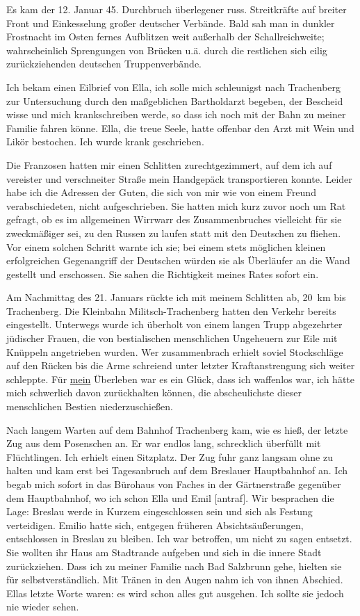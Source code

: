 Es kam der 12. Januar 45. Durchbruch überlegener russ. Streitkräfte auf breiter Front und Einkesselung großer deutscher Verbände. Bald sah man in dunkler Frostnacht im Osten fernes Aufblitzen weit außerhalb der Schallreichweite; wahrscheinlich Sprengungen von Brücken u.ä. durch die restlichen sich eilig zurückziehenden deutschen Truppenverbände.

Ich bekam einen Eilbrief von Ella, ich solle mich schleunigst nach Trachenberg zur Untersuchung durch den maßgeblichen Bartholdarzt begeben, der Bescheid wisse und mich krankschreiben werde, so dass ich noch mit der Bahn zu meiner Familie fahren könne. Ella, die treue Seele, hatte offenbar den Arzt mit Wein und Likör bestochen. Ich wurde krank geschrieben.

 Die Franzosen hatten mir einen Schlitten zurechtgezimmert, auf dem ich auf vereister und verschneiter Straße mein Handgepäck transportieren konnte. Leider habe ich die Adressen der Guten, die sich von mir wie von einem Freund verabschiedeten, nicht aufgeschrieben. Sie hatten mich kurz zuvor noch um Rat gefragt, ob es im allgemeinen Wirrwarr des Zusammenbruches vielleicht für sie zweckmäßiger sei, zu den Russen zu laufen statt mit den Deutschen zu fliehen. Vor einem solchen Schritt warnte ich sie; bei einem stets möglichen kleinen erfolgreichen Gegenangriff der Deutschen würden sie als Überläufer an die Wand gestellt und erschossen. Sie sahen die Richtigkeit meines Rates sofort ein.

Am Nachmittag des 21. Januars rückte ich mit meinem Schlitten ab, 20~km bis Trachenberg. Die Kleinbahn Militsch-Trachenberg hatten den Verkehr bereits eingestellt. Unterwegs wurde ich überholt von einem langen Trupp abgezehrter jüdischer Frauen, die von bestialischen menschlichen Ungeheuern zur Eile mit Knüppeln angetrieben wurden. Wer zusammenbrach erhielt soviel Stockschläge auf den Rücken bis die Arme schreiend unter letzter Kraftanstrengung sich weiter schleppte. Für \underline{mein} Überleben war es ein Glück, dass ich waffenlos war, ich hätte mich schwerlich davon zurückhalten können, die abscheulichste dieser menschlichen Bestien niederzuschießen.

Nach langem Warten auf dem Bahnhof Trachenberg kam, wie es hieß, der letzte Zug aus dem Posenschen an. Er war endlos lang, schrecklich überfüllt mit Flüchtlingen. Ich erhielt einen Sitzplatz. Der Zug fuhr ganz langsam ohne zu halten und kam erst bei Tagesanbruch auf dem Breslauer Hauptbahnhof an. Ich begab mich sofort in das Bürohaus von Faches in der Gärtnerstraße gegenüber dem Hauptbahnhof, wo ich schon Ella und Emil [antraf]. Wir besprachen die Lage: Breslau werde in Kurzem eingeschlossen sein und sich als Festung verteidigen. Emilio hatte sich, entgegen früheren Absichtsäußerungen, entschlossen in Breslau zu bleiben. Ich war betroffen, um nicht zu sagen entsetzt. Sie wollten ihr Haus am Stadtrande aufgeben und sich in die innere Stadt zurückziehen. Dass ich zu meiner Familie nach Bad Salzbrunn gehe, hielten sie für selbstverständlich. Mit Tränen in den Augen nahm ich von ihnen Abschied. Ellas letzte Worte waren: es wird schon alles gut ausgehen. Ich sollte sie jedoch nie wieder sehen.

